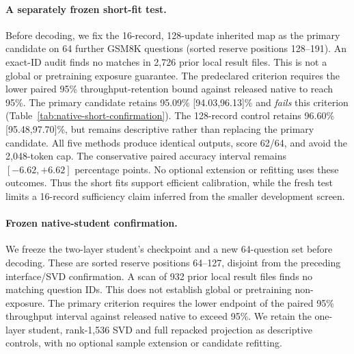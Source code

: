 \documentclass{article}
\begin{document}


\paragraph{A separately frozen short-fit test.}
Before decoding, we fix the 16-record, 128-update inherited map as the
primary candidate on 64 further GSM8K questions (sorted reserve positions
128--191). An exact-ID audit finds no matches in 2,726 prior local result
files. This is not a global or pretraining exposure guarantee. The
predeclared criterion requires the lower paired 95\% throughput-retention
bound against released native to reach 95\%. The primary candidate retains
95.09\% [94.03,96.13]\% and \emph{fails} this criterion
(Table~\ref{tab:native-short-confirmation}). The 128-record control retains
96.60\% [95.48,97.70]\%, but remains descriptive rather than replacing
the primary candidate. All five methods produce identical outputs,
score 62/64, and avoid the 2,048-token cap. The conservative paired
accuracy interval remains $[-6.62,+6.62]$ percentage points. No optional
extension or refitting uses these outcomes. Thus the short fits support
efficient calibration, while the fresh test limits a 16-record sufficiency
claim inferred from the smaller development screen.

\begin{table}[H]
\centering\small

\caption{Frozen short-fit comparison on 64 additional GSM8K questions.
Only the 16-record map is primary. All fitted compact maps inherit native
columns and use 128 updates. Intervals use 10,000 paired question bootstrap
replicates, seed 1729, and exclude fitting-data and fitting-seed variation.}
\label{tab:native-short-confirmation}
\end{table}


\paragraph{Frozen native-student confirmation.}
We freeze the two-layer student's checkpoint and a new
64-question set before decoding. These are sorted reserve positions
64--127, disjoint from the preceding interface/SVD confirmation.
A scan of 932 prior local result files finds no matching question IDs.
This does not establish global or pretraining non-exposure. The primary
criterion requires the lower endpoint of the paired 95\% throughput
interval against released native to exceed 95\%. We retain the one-layer
student, rank-1,536 SVD and full repacked projection as descriptive
controls, with no optional sample extension or candidate refitting.
\end{document}
